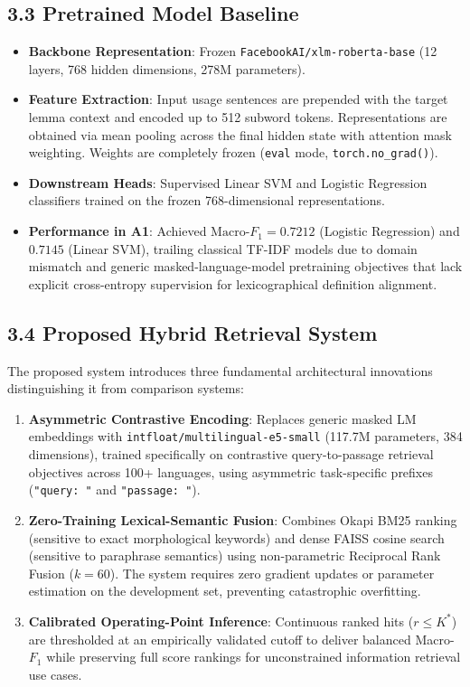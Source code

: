\subsection{3.3 Pretrained Model Baseline}
\begin{itemize}
    \item \textbf{Backbone Representation}: Frozen \texttt{FacebookAI/xlm-roberta-base} (12 layers, 768 hidden dimensions, 278M parameters).
    \item \textbf{Feature Extraction}: Input usage sentences are prepended with the target lemma context and encoded up to 512 subword tokens. Representations are obtained via mean pooling across the final hidden state with attention mask weighting. Weights are completely frozen (\texttt{eval} mode, \texttt{torch.no\_grad()}).
    \item \textbf{Downstream Heads}: Supervised Linear SVM and Logistic Regression classifiers trained on the frozen 768-dimensional representations.
    \item \textbf{Performance in A1}: Achieved $\text{Macro-}F_1 = 0.7212$ (Logistic Regression) and $0.7145$ (Linear SVM), trailing classical TF-IDF models due to domain mismatch and generic masked-language-model pretraining objectives that lack explicit cross-entropy supervision for lexicographical definition alignment.
\end{itemize}

\subsection{3.4 Proposed Hybrid Retrieval System}
The proposed system introduces three fundamental architectural innovations distinguishing it from comparison systems:
\begin{enumerate}
    \item \textbf{Asymmetric Contrastive Encoding}: Replaces generic masked LM embeddings with \texttt{intfloat/multilingual-e5-small} (117.7M parameters, 384 dimensions), trained specifically on contrastive query-to-passage retrieval objectives across 100+ languages, using asymmetric task-specific prefixes (\texttt{"query: "} and \texttt{"passage: "}).
    \item \textbf{Zero-Training Lexical-Semantic Fusion}: Combines Okapi BM25 ranking (sensitive to exact morphological keywords) and dense FAISS cosine search (sensitive to paraphrase semantics) using non-parametric Reciprocal Rank Fusion ($k=60$). The system requires zero gradient updates or parameter estimation on the development set, preventing catastrophic overfitting.
    \item \textbf{Calibrated Operating-Point Inference}: Continuous ranked hits ($r \le K^*$) are thresholded at an empirically validated cutoff to deliver balanced Macro-$F_1$ while preserving full score rankings for unconstrained information retrieval use cases.
\end{enumerate}

